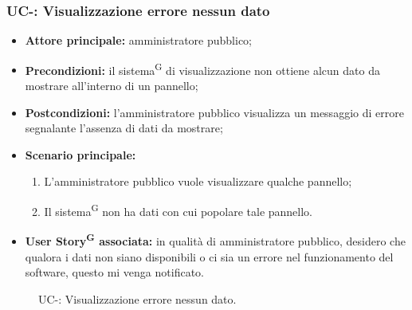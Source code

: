 \documentclass[8pt]{article}
\newcommand{\glossterm}[1]{#1\textsuperscript{G}} %
\begin{document}
\subsubsection*{UC-\ucnumber: Visualizzazione errore nessun dato}
\begin{itemize}
    \item \textbf{Attore principale:} amministratore pubblico;
    \item \textbf{Precondizioni:} il \glossterm{sistema} di visualizzazione non ottiene alcun dato da mostrare all’interno di un pannello;
    \item \textbf{Postcondizioni:} l’amministratore pubblico visualizza un messaggio di errore segnalante l’assenza di dati da mostrare;
    \item \textbf{Scenario principale:}
        \begin{enumerate}
        \item L’amministratore pubblico vuole visualizzare qualche pannello;
        \item Il \glossterm{sistema} non ha dati con cui popolare tale pannello.
        \end{enumerate}
    \item \textbf{\glossterm{User Story} associata:} in qualità di amministratore pubblico, desidero che qualora i dati non siano disponibili o ci sia un errore nel funzionamento del software, questo mi venga notificato.
\end{itemize}
\begin{figure}[ht!]
    \centering
    \caption{UC-\theuc: Visualizzazione errore nessun dato.}
    \label{fig:UC-\theuc: Visualizzazione errore nessun dato}
\end{figure}
\newpage
\end{document}
